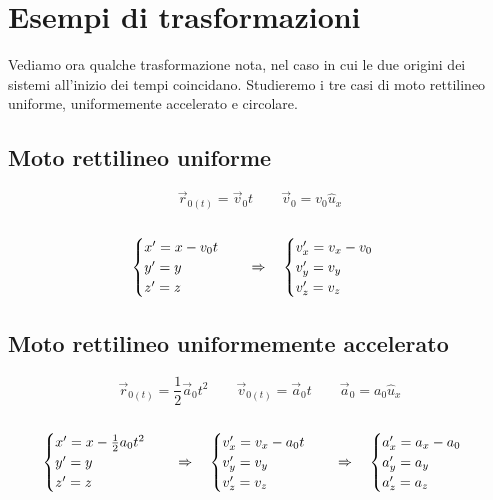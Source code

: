 \section{Esempi di trasformazioni}
Vediamo ora qualche trasformazione nota, nel caso in cui le due origini dei
sistemi all'inizio dei tempi coincidano. Studieremo i tre casi di moto rettilineo
uniforme, uniformemente accelerato e circolare.

\subsection{Moto rettilineo uniforme}

\begin{equation}
    \vec r_{0(t)} = \vec v_0 t\qquad \vec v_0 = v_0\hat u_x
\end{equation}
\\
\begin{equation}
    \begin{cases}
        x' = x - v_0t\\
        y' = y\\
        z' = z
    \end{cases}\quad\Rightarrow\quad
    \begin{cases}
        v_x' = v_x - v_0\\
        v_y' = v_y\\
        v_z' = v_z
    \end{cases}
\end{equation}

\subsection{Moto rettilineo uniformemente accelerato}

\begin{equation}
    \vec r_{0(t)} = \frac12\vec a_0 t^2\qquad \vec v_{0(t)} = \vec a_0t
    \qquad \vec a_0 = a_0\hat u_x
\end{equation}
\\
\begin{equation}
    \begin{cases}
        x' = x - \frac12a_0t^2\\
        y' = y\\
        z' = z
    \end{cases}\quad\Rightarrow\quad
    \begin{cases}
        v_x' = v_x - a_0t\\
        v_y' = v_y\\
        v_z' = v_z
    \end{cases}\quad\Rightarrow\quad
    \begin{cases}
        a_x' = a_x - a_0\\
        a_y' = a_y\\
        a_z' = a_z
    \end{cases}
\end{equation}

